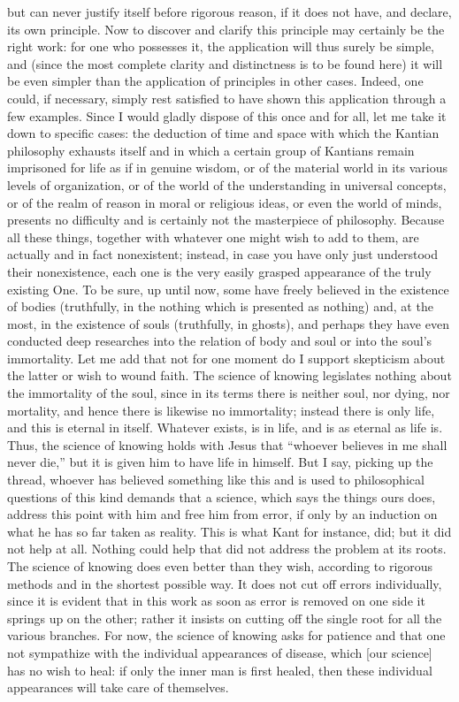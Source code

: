 but can never justify itself before rigorous reason,
if it does not have, and declare, its own principle.
Now to discover and clarify this principle may
certainly be the right work:
for one who possesses it,
the application will thus surely be simple,
and (since the most complete clarity and distinctness is
to be found here)
it will be even simpler than the
application of principles in other cases.
Indeed, one could, if necessary,
simply rest satisfied to have shown
this application through a few examples.
Since I would gladly dispose of this once and for all,
let me take it down to specific cases:
the deduction of time and space
with which the Kantian philosophy exhausts itself
and in which a certain group of Kantians remain
imprisoned for life as if in genuine wisdom,
or of the material world in its various levels of organization,
or of the world of the understanding in universal concepts,
or of the realm of reason in moral or religious ideas,
or even the world of minds,
presents no difficulty and is certainly
not the masterpiece of philosophy.
Because all these things,
together with whatever one might wish to add to them,
are actually and in fact nonexistent;
instead, in case you have only just understood their nonexistence,
each one is the very easily grasped appearance
of the truly existing One.
To be sure, up until now,
some have freely believed in the existence of bodies
(truthfully, in the nothing which is presented as nothing)
and, at the most, in the existence of souls
(truthfully, in ghosts),
and perhaps they have even conducted
deep researches into the relation of body and soul
or into the soul's immortality.
Let me add that not for one moment do I support
skepticism about the latter or wish to wound faith.
The science of knowing legislates
nothing about the immortality of the soul,
since in its terms there is
neither soul, nor dying, nor mortality,
and hence there is likewise no immortality;
instead there is only life,
and this is eternal in itself.
Whatever exists, is in life,
and is as eternal as life is.
Thus, the science of knowing holds with Jesus that
“whoever believes in me shall never die,”
but it is given him to have life in himself.
But I say, picking up the thread,
whoever has believed something like this
and is used to philosophical questions of this kind
demands that a science, which says the things ours does,
address this point with him and free him from error,
if only by an induction on what he has so far taken as reality.
This is what Kant for instance, did;
but it did not help at all.
Nothing could help that did not address the problem at its roots.
The science of knowing does even better than they wish,
according to rigorous methods and in the shortest possible way.
It does not cut off errors individually,
since it is evident that in this work
as soon as error is removed on one side
it springs up on the other;
rather it insists on cutting off
the single root for all the various branches.
For now, the science of knowing asks for patience
and that one not sympathize with
the individual appearances of disease,
which [our science] has no wish to heal:
if only the inner man is first healed,
then these individual appearances
will take care of themselves.

